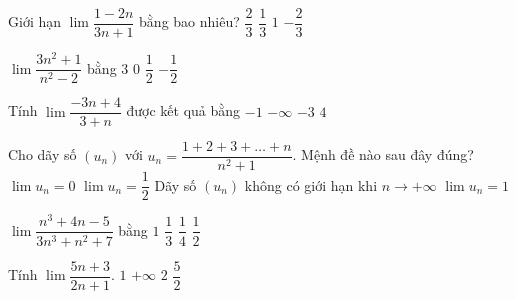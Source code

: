 \begin{ex}%
	Giới hạn $\lim\dfrac{1-2n}{3n+1}$ bằng  bao nhiêu?
	\choice 
		{$\dfrac{2}{3}$} 
		 {$\dfrac{1}{3}$}
		{$1$} 
		 {\True $-\dfrac{2}{3}$}
\end{ex}

\begin{ex}%
	$\lim\dfrac{3n^2+1}{n^2-2}$ bằng 
	 \choice
		{\True  $3$}
		 {$0$}
		 {$\dfrac{1}{2}$}
		{$-\dfrac{1}{2}$} 
\end{ex}

\begin{ex}%
	Tính $\lim\dfrac{-3n+4}{3+n}$ được kết  quả bằng
	\choice 
		 {$-1$}
		 {$-\infty$}
		{\True $-3$} 
		{$4$} 
\end{ex}

\begin{ex}%
	Cho dãy  số $(u_n)$ với $u_n=\dfrac{1+2+3+\ldots+n}{n^2+1}$. Mệnh đề nào sau đây đúng?
	\choice 
		 {$\lim u_n=0$}
		{\True  $\lim u_n=\dfrac{1}{2}$}
		{Dãy số $(u_n)$ không có giới hạn khi $n\to+\infty$} 
		{$\lim  u_n=1$}
\end{ex}

\begin{ex}%
	$\lim\dfrac{n^3+4n-5}{3n^3+n^2+7}$  bằng
	\choice 
		 {$1$}
		{\True $\dfrac{1}{3}$} 
		 {$\dfrac{1}{4}$}
		{$\dfrac{1}{2}$} 
\end{ex}

\begin{ex}%
	Tính $\lim\dfrac{5n+3}{2n+1}$. 
	\choice 
		{$1$} 
		{$+\infty  $}
		 {$2$}
		{\True  $\dfrac{5}{2}$}
\end{ex}

